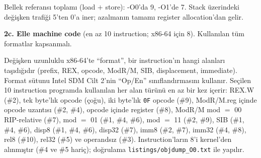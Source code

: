\documentclass[11pt,a4paper]{article}
\newcommand{\tl}{\texttt}
\begin{document}
Bellek referansı toplamı (load $+$ store): -O0'da 9, -O1'de 7. Stack üzerindeki değişken
trafiği 5'ten 0'a iner; azalmanın tamamı register allocation'dan gelir.

\textbf{2c. Elle machine code} (en az 10 instruction; x86-64 için 8). Kullanılan tüm formatlar
kapsanmalı.

Değişken uzunluklu x86-64'te ``format'', bir instruction'ın hangi alanları taşıdığıdır (prefix,
REX, opcode, ModR/M, SIB, displacement, immediate). Format sütunu Intel SDM Cilt 2'nin
``Op/En'' sınıflandırmasını kullanır. Seçilen 10 instruction programda kullanılan her alan türünü
en az bir kez içerir: REX.W (\#2), tek byte'lık opcode (çoğu), iki byte'lık \tl{0F} opcode (\#9),
ModR/M.reg içinde opcode uzantısı (\#2, \#4), opcode içinde register (\#8), ModR/M mod $=$ 00
RIP-relative (\#7), mod $=$ 01 (\#1, \#4, \#6), mod $=$ 11 (\#2, \#9), SIB (\#1, \#4, \#6), disp8
(\#1, \#4, \#6), disp32 (\#7), imm8 (\#2, \#7), imm32 (\#4, \#8), rel8 (\#10), rel32 (\#5) ve
operandsız (\#3). Instruction'ların 8'i kernel'den alınmıştır (\#4 ve \#5 hariç); doğrulama
\tl{listings/objdump\_O0.txt} ile yapılır.
\end{document}
